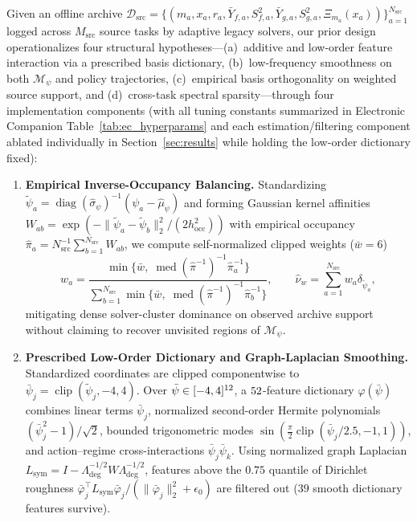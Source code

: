Given an offline archive $\mathcal{D}_{\mathrm{src}} = \{(m_a, x_a, r_a, \bar{Y}_{f,a}, S_{f,a}^2, \bar{Y}_{g,a}, S_{g,a}^2, \Xi_{m_a}(x_a))\}_{a=1}^{N_{\mathrm{src}}}$ logged across $M_{\mathrm{src}}$ source tasks by adaptive legacy solvers, our prior design operationalizes four structural hypotheses—(a)~additive and low-order feature interaction via a prescribed basis dictionary, (b)~low-frequency smoothness on both $\mathcal{M}_\psi$ and policy trajectories, (c)~empirical basis orthogonality on weighted source support, and (d)~cross-task spectral sparsity—through four implementation components (with all tuning constants summarized in Electronic Companion Table~\ref*{tab:ec_hyperparams} and each estimation/filtering component ablated individually in Section~\ref{sec:results} while holding the low-order dictionary fixed):
\begin{enumerate}
  \item \textbf{Empirical Inverse-Occupancy Balancing.} Standardizing $\tilde{\psi}_a = \operatorname{diag}(\hat{\sigma}_\psi)^{-1}(\psi_a - \hat{\mu}_\psi)$ and forming Gaussian kernel affinities $W_{ab} = \exp(-\|\tilde{\psi}_a - \tilde{\psi}_b\|_2^2 / (2 h_{\mathrm{occ}}^2))$ with empirical occupancy $\hat{\pi}_a = N_{\mathrm{src}}^{-1}\sum_{b=1}^{N_{\mathrm{src}}} W_{ab}$, we compute self-normalized clipped weights ($\bar{w} = 6$)
  \begin{equation}\label{eq:inv_occ_weights}
    w_a = \frac{\min\{\bar{w},\; \operatorname{med}(\hat{\pi}^{-1})^{-1}\hat{\pi}_a^{-1}\}}{\sum_{b=1}^{N_{\mathrm{src}}} \min\{\bar{w},\; \operatorname{med}(\hat{\pi}^{-1})^{-1}\hat{\pi}_b^{-1}\}},
    \qquad \hat{\nu}_w = \sum_{a=1}^{N_{\mathrm{src}}} w_a \delta_{\tilde{\psi}_a},
  \end{equation}
  mitigating dense solver-cluster dominance on observed archive support without claiming to recover unvisited regions of $\mathcal{M}_\psi$.

  \item \textbf{Prescribed Low-Order Dictionary and Graph-Laplacian Smoothing.} Standardized coordinates are clipped componentwise to $\bar{\psi}_j = \operatorname{clip}(\tilde{\psi}_j, -4, 4)$. Over $\bar{\psi} \in [-4,4]^{12}$, a $52$-feature dictionary $\varphi(\bar{\psi})$ combines linear terms $\bar{\psi}_j$, normalized second-order Hermite polynomials $(\bar{\psi}_j^2 - 1)/\sqrt{2}$, bounded trigonometric modes $\sin(\frac{\pi}{2}\operatorname{clip}(\bar{\psi}_j/2.5, -1, 1))$, and action--regime cross-interactions $\bar{\psi}_j \bar{\psi}_k$. Using normalized graph Laplacian $L_{\mathrm{sym}} = I - \Lambda_{\mathrm{deg}}^{-1/2} W \Lambda_{\mathrm{deg}}^{-1/2}$, features above the $0.75$ quantile of Dirichlet roughness $\bar{\varphi}_j^\top L_{\mathrm{sym}} \bar{\varphi}_j / (\|\bar{\varphi}_j\|_2^2 + \epsilon_0)$ are filtered out ($39$ smooth dictionary features survive).


\end{enumerate}
